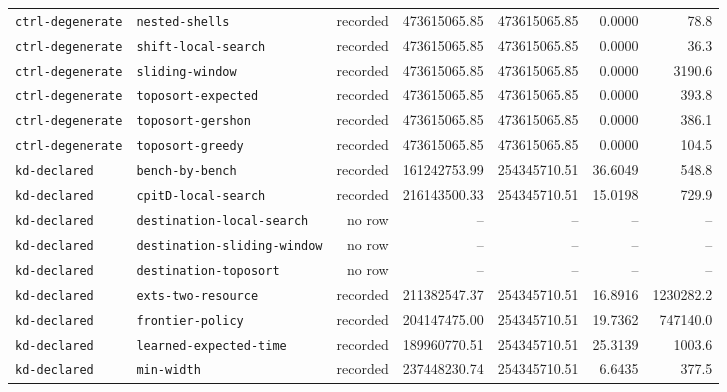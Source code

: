 \begin{longtable}{>{\raggedright\arraybackslash}p{}>{\raggedright\arraybackslash}p{}r r r r r}
\texttt{ctrl\allowbreak-degenerate} & \texttt{nested\allowbreak-shells} & recorded & 473615065.85 & 473615065.85 & 0.0000 & 78.8 \\
\texttt{ctrl\allowbreak-degenerate} & \texttt{shift\allowbreak-local\allowbreak-search} & recorded & 473615065.85 & 473615065.85 & 0.0000 & 36.3 \\
\texttt{ctrl\allowbreak-degenerate} & \texttt{sliding\allowbreak-window} & recorded & 473615065.85 & 473615065.85 & 0.0000 & 3190.6 \\
\texttt{ctrl\allowbreak-degenerate} & \texttt{toposort\allowbreak-expected} & recorded & 473615065.85 & 473615065.85 & 0.0000 & 393.8 \\
\texttt{ctrl\allowbreak-degenerate} & \texttt{toposort\allowbreak-gershon} & recorded & 473615065.85 & 473615065.85 & 0.0000 & 386.1 \\
\texttt{ctrl\allowbreak-degenerate} & \texttt{toposort\allowbreak-greedy} & recorded & 473615065.85 & 473615065.85 & 0.0000 & 104.5 \\
\texttt{kd\allowbreak-declared} & \texttt{bench\allowbreak-by\allowbreak-bench} & recorded & 161242753.99 & 254345710.51 & 36.6049 & 548.8 \\
\texttt{kd\allowbreak-declared} & \texttt{cpitD\allowbreak-local\allowbreak-search} & recorded & 216143500.33 & 254345710.51 & 15.0198 & 729.9 \\
\texttt{kd\allowbreak-declared} & \texttt{destination\allowbreak-local\allowbreak-search} & no row & -- & -- & -- & -- \\
\texttt{kd\allowbreak-declared} & \texttt{destination\allowbreak-sliding\allowbreak-window} & no row & -- & -- & -- & -- \\
\texttt{kd\allowbreak-declared} & \texttt{destination\allowbreak-toposort} & no row & -- & -- & -- & -- \\
\texttt{kd\allowbreak-declared} & \texttt{exts\allowbreak-two\allowbreak-resource} & recorded & 211382547.37 & 254345710.51 & 16.8916 & 1230282.2 \\
\texttt{kd\allowbreak-declared} & \texttt{frontier\allowbreak-policy} & recorded & 204147475.00 & 254345710.51 & 19.7362 & 747140.0 \\
\texttt{kd\allowbreak-declared} & \texttt{learned\allowbreak-expected\allowbreak-time} & recorded & 189960770.51 & 254345710.51 & 25.3139 & 1003.6 \\
\texttt{kd\allowbreak-declared} & \texttt{min\allowbreak-width} & recorded & 237448230.74 & 254345710.51 & 6.6435 & 377.5 \\

\end{longtable}
